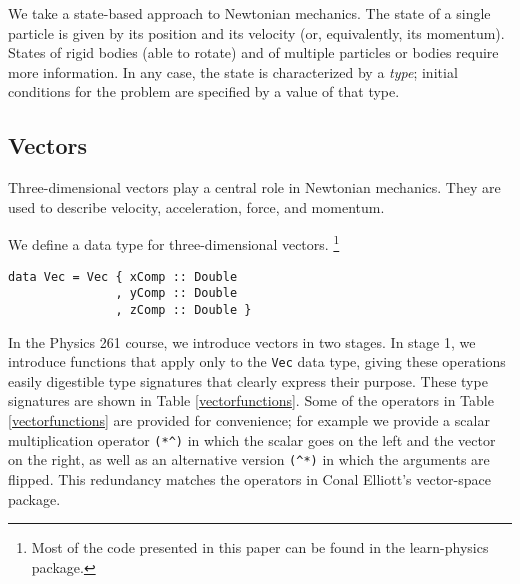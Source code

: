 \documentclass{eptcs}
\begin{document}
We take a state-based approach to Newtonian mechanics.
The state of a single particle is given by its position and its
velocity (or, equivalently, its momentum).  States of rigid bodies
(able to rotate) and of multiple particles or bodies require more information.
In any case, the state is characterized by a \emph{type};
initial conditions for the problem are specified by a value of that type.

\subsection{Vectors}

Three-dimensional vectors play a central role in Newtonian mechanics.
They are used to describe velocity, acceleration, force, and momentum.

We define a data type for three-dimensional vectors.
\footnote{Most of the code presented in this paper can be found in the
learn-physics package\cite{learn-physics}.}
\begin{verbatim}
data Vec = Vec { xComp :: Double
               , yComp :: Double
               , zComp :: Double }
\end{verbatim}

In the Physics 261 course, we introduce vectors in two stages.
In stage 1, we introduce functions that apply only to
the \verb|Vec| data type, giving these operations easily digestible
type signatures that clearly express their purpose.  These type
signatures are shown in Table \ref{vectorfunctions}.
Some of the operators in Table \ref{vectorfunctions}
are provided for convenience; for example
we provide a scalar multiplication operator \verb|(*^)| in which
the scalar goes on the left and the vector on the right,
as well as an alternative version \verb|(^*)| in which the
arguments are flipped.  This redundancy matches the operators
in Conal Elliott's vector-space package\cite{vector-space}.
\end{document}
